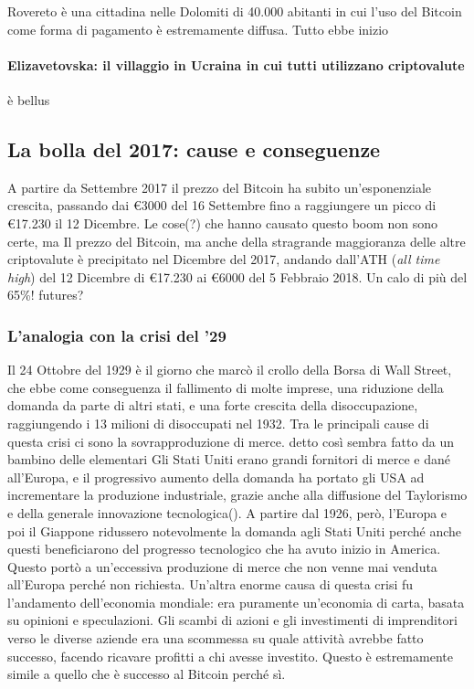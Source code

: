 \documentclass {article}
\begin{document}
Rovereto è una cittadina nelle Dolomiti di 40.000 abitanti in cui l'uso del Bitcoin come forma di pagamento è estremamente diffusa.
Tutto ebbe inizio


\paragraph {Elizavetovska: il villaggio in Ucraina in cui tutti utilizzano criptovalute}


è bellus


\subsection {La bolla del 2017: cause e conseguenze}


A partire da Settembre 2017 il prezzo del Bitcoin ha subito un'esponenziale crescita, passando dai \euro{3000} del 16 Settembre fino a raggiungere un picco di \euro{17.230} il 12 Dicembre.
Le cose(?) che hanno causato questo boom non sono certe, ma
Il prezzo del Bitcoin, ma anche della stragrande maggioranza delle altre criptovalute è precipitato nel Dicembre del 2017, andando dall'ATH (\textit{all time high}) del 12 Dicembre di \euro{17.230} ai \euro{6000} del 5 Febbraio 2018. Un calo di più del 65\%!
futures?


\subsubsection {L'analogia con la crisi del '29}


Il 24 Ottobre del 1929 è il giorno che marcò il crollo della Borsa di Wall Street, che ebbe come conseguenza il fallimento di molte imprese, una riduzione della domanda da parte di altri stati, e una forte crescita della disoccupazione, raggiungendo i 13 milioni di disoccupati nel 1932.
Tra le principali cause di questa crisi ci sono la sovrapproduzione di merce. detto così sembra fatto da un bambino delle elementari
Gli Stati Uniti erano grandi fornitori di merce e dané all'Europa, e il progressivo aumento della domanda ha portato gli USA ad incrementare la produzione industriale, grazie anche alla diffusione del Taylorismo e della generale innovazione tecnologica().
A partire dal 1926, però, l'Europa e poi il Giappone ridussero notevolmente la domanda agli Stati Uniti perché anche questi beneficiarono del progresso tecnologico che ha avuto inizio in America.
Questo portò a un'eccessiva produzione di merce che non venne mai venduta all'Europa perché non richiesta.
Un'altra enorme causa di questa crisi fu l'andamento dell'economia mondiale: era puramente un'economia di carta, basata su opinioni e speculazioni.
Gli scambi di azioni e gli investimenti di imprenditori verso le diverse aziende era una scommessa su quale attività avrebbe fatto successo, facendo ricavare profitti a chi avesse investito.
Questo è estremamente simile a quello che è successo al Bitcoin perché sì.
\end{document}
